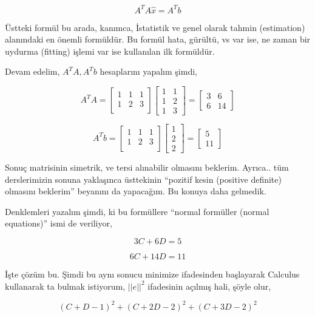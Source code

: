 \documentclass[12pt,fleqn]{article}\usepackage{../../common}
\begin{document}
$$ A^T A\hat{x} = A^Tb $$

Üstteki formül bu arada, kanımca, İstatistik ve genel olarak tahmin
(estimation) alanındaki en önemli formüldür. Bu formül hata, gürültü, vs
var ise, ne zaman bir uydurma (fitting) işlemi var ise kullanılan ilk
formüldür.

Devam edelim, $A^TA,A^Tb$ hesaplarını yapalım şimdi,

$$ 
A^TA = 
\left[\begin{array}{rrr}
1 & 1 & 1\\
1 & 2 & 3\\
\end{array}\right]
\left[\begin{array}{rr}
1 & 1 \\
1 & 2 \\
1 & 3
\end{array}\right] =
\left[\begin{array}{rr}
3 & 6 \\
6 & 14
\end{array}\right] 
 $$

$$ A^Tb = 
\left[\begin{array}{rrr}
1 & 1 & 1\\
1 & 2 & 3\\
\end{array}\right]
\left[\begin{array}{r}
1 \\
2 \\
2
\end{array}\right] =
\left[\begin{array}{r}
5 \\
11 
\end{array}\right]
 $$

Sonuç matrisinin simetrik, ve tersi alınabilir olmasını
beklerim. Ayrıca.. tüm derslerimizin sonuna yaklaşınca üsttekinin ``pozitif
kesin (positive definite) olmasını beklerim'' beyanını da yapacağım. Bu
konuya daha gelmedik. 

Denklemleri yazalım şimdi, ki bu formüllere ``normal formüller (normal
equations)'' ismi de veriliyor,

$$ 3C + 6D = 5 $$

$$ 6C + 14D = 11 $$

İşte çözüm bu. Şimdi bu aynı sonucu minimize ifadesinden başlayarak
Calculus kullanarak ta bulmak istiyorum, $||e||^2$ ifadesinin açılmış hali,
şöyle olur, 

$$ (C+D-1)^2 + (C+2D-2)^2 + (C+3D-2)^2 $$
\end{document}
